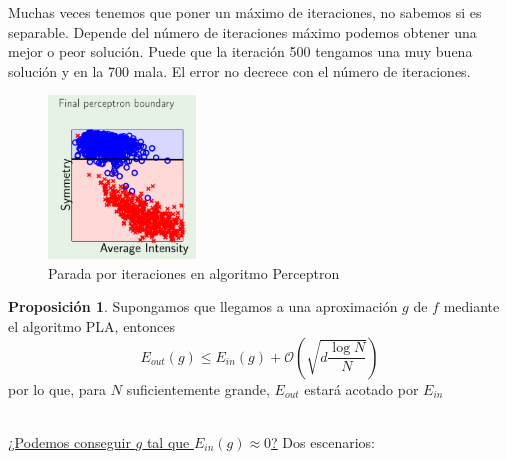 \documentclass[11pt,a4paper]{article}
\theoremstyle{definition}
\newtheorem{proposition}{Proposición}[section]
\begin{document}
	Muchas veces tenemos que poner un máximo de iteraciones, no sabemos si es separable. Depende del número de iteraciones máximo podemos obtener una mejor o peor solución. Puede que la iteración 500 tengamos una muy buena solución y en la 700 mala. El error no decrece con el número de iteraciones.	
	\begin{figure}[H]
	\centering
	\includegraphics[width=0.35\textwidth]{images/percep_boundary}
	\caption{Parada por iteraciones en algoritmo Perceptron}
	\end{figure}
	\begin{proposition}
	Supongamos que llegamos a una aproximación $g$ de $f$ mediante el algoritmo PLA, entonces
	$$E_{out}(g)\leq E_{in}(g) + \mathcal{O}\left(\sqrt{d\frac{\log N}{N}}\right)$$
	por lo que, para $N$ suficientemente grande, $E_{out}$ estará acotado por $E_{in}$ 
	\end{proposition}~\\
	
	\underline{¿Podemos conseguir $g$ tal que $E_{in}(g) \approx 0$?} Dos escenarios:
	
\end{document}
